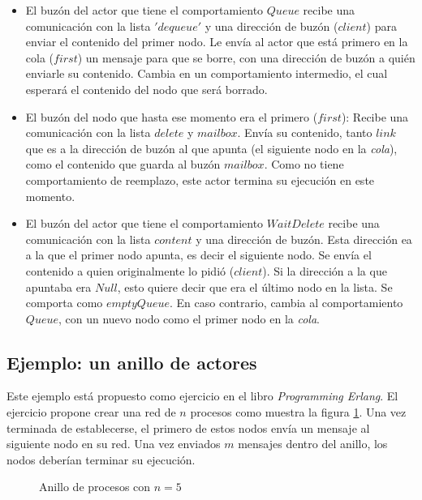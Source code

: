 \begin{itemize}
 \item El buzón del actor que tiene el comportamiento $Queue$ recibe una comunicación con la lista $'dequeue'$ y una dirección de buzón ($client$) para enviar el contenido del primer nodo.
 \subitem Le envía al actor que está primero en la cola ($first$) un mensaje para que se borre, con una dirección de buzón a quién enviarle su contenido.
 \subitem Cambia en un comportamiento intermedio, el cual esperará el contenido del nodo que será borrado.
 \item El buzón del nodo que hasta ese momento era el primero ($first$):
 \subitem Recibe una comunicación con la lista $delete$ y $mailbox$.
 \subitem Envía su contenido, tanto $link$ que es a la dirección de buzón al que apunta (el siguiente nodo en la \textit{cola}), como el contenido que guarda al buzón $mailbox$. Como no tiene comportamiento de reemplazo, este actor termina su ejecución en este momento.
 \item El buzón del actor que tiene el comportamiento $WaitDelete$ recibe una comunicación con la lista $content$ y una dirección de buzón. Esta dirección ea a la que el primer nodo apunta, es decir el siguiente nodo.
 \subitem Se envía el contenido a quien originalmente lo pidió ($client$).
 \subitem Si la dirección a la que apuntaba era $Null$, esto quiere decir que era el último nodo en la lista. Se comporta como $emptyQueue$.
 \subitem En caso contrario, cambia al comportamiento $Queue$, con un nuevo nodo como el primer nodo en la \textit{cola}.
\end{itemize}


\subsection{Ejemplo: un anillo de actores}
Este ejemplo está propuesto como ejercicio en el libro \textit{Programming Erlang}\cite[Página 115, Ejercicio 4-2: The Process Ring]{Cesarini:2009:EP:1717841}. El ejercicio propone crear una red de $n$ procesos como muestra la figura \ref{fig:anillo}. Una vez terminada de establecerse, el primero de estos nodos envía un mensaje al siguiente nodo en su red.  Una vez enviados $m$ mensajes dentro del anillo, los nodos deberían terminar su ejecución.

\begin{figure}[H]
\centering
{}
\caption{Anillo de procesos con $n=5$}
\label{fig:anillo}
\end{figure}

